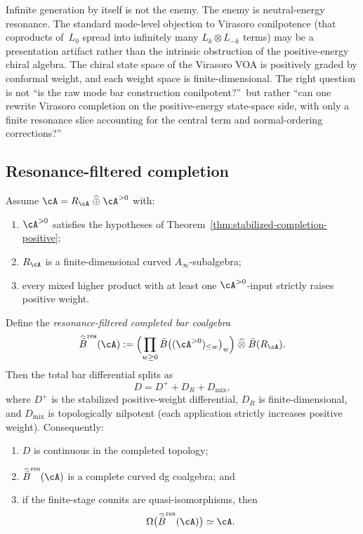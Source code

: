 \begin{remark}
\label{rem:resonance-true-obstruction}
Infinite generation by itself is not the enemy.
The enemy is neutral-energy resonance.  The standard
mode-level objection to Virasoro conilpotence (that
coproducts of~$L_0$ spread into infinitely many
$L_k \otimes L_{-k}$ terms) may be a presentation artifact
rather than the intrinsic obstruction of the positive-energy
chiral algebra.  The chiral state space of the Virasoro VOA
is positively graded by conformal weight, and each weight space
is finite-dimensional.  The right question is not ``is the raw
mode bar construction conilpotent?''\ but rather ``can one
rewrite Virasoro completion on the positive-energy state-space
side, with only a finite resonance slice accounting for the
central term and normal-ordering corrections?''
\end{remark}

\subsection{Resonance-filtered completion}

\begin{theorem}
\label{thm:resonance-filtered-bar-cobar}
Assume $\cA = R_\cA \;\widehat{\oplus}\; \cA^{>0}$ with:
\begin{enumerate}
\item $\cA^{>0}$ satisfies the hypotheses of
  Theorem~\textup{\ref{thm:stabilized-completion-positive}};
\item $R_\cA$ is a finite-dimensional curved $A_\infty$-subalgebra;
\item every mixed higher product with at least one
  $\cA^{>0}$-input strictly raises positive weight.
\end{enumerate}
Define the \emph{resonance-filtered completed bar coalgebra}
\[
\widehat{\bar B}^{\mathrm{res}}(\cA)
:=
\Bigl(\prod_{w \ge 0}
  \bar B\bigl((\cA^{>0})_{\le w}\bigr)_w\Bigr)
\;\widehat{\otimes}\;
\bar B(R_\cA).
\]
Then the total bar differential splits as
\[
D = D^+ + D_R + D_{\mathrm{mix}},
\]
where $D^+$ is the stabilized positive-weight differential,
$D_R$ is finite-dimensional, and $D_{\mathrm{mix}}$ is
topologically nilpotent (each application strictly increases
positive weight).  Consequently:
\begin{enumerate}
\item $D$ is continuous in the completed topology;
\item $\widehat{\bar B}^{\mathrm{res}}(\cA)$ is a complete
  curved dg coalgebra; and
\item if the finite-stage counits are quasi-isomorphisms, then
  \[
  \Omega\bigl(\widehat{\bar B}^{\mathrm{res}}(\cA)\bigr)
  \simeq \cA.
  \]
\end{enumerate}
\end{theorem}

